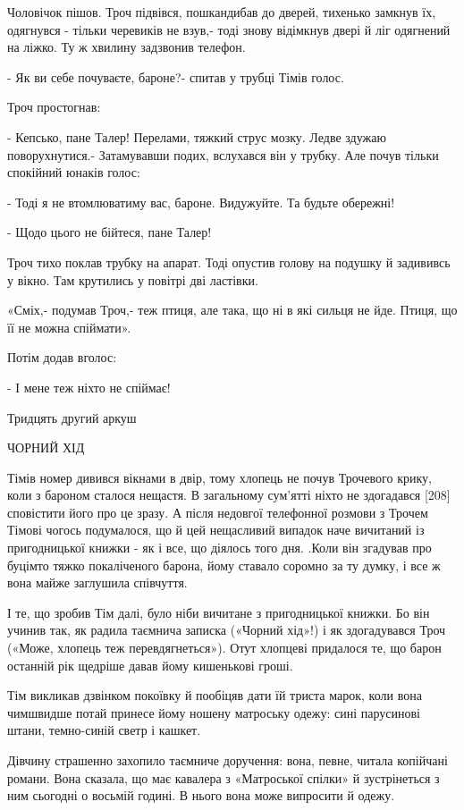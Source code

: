 Чоловічок пішов. Троч підвівся, пошкандибав до дверей, тихенько замкнув їх, одягнувся - тільки черевиків не взув,- тоді знову відімкнув двері й ліг одягнений на ліжко. Ту ж хвилину задзвонив телефон.

- Як ви себе почуваєте, бароне?- спитав у трубці Тімів голос.

Троч простогнав:

- Кепсько, пане Талер! Перелами, тяжкий струс мозку. Ледве здужаю поворухнутися.- Затамувавши подих, вслухався він у трубку. Але почув тільки спокійний юнаків голос:

- Тоді я не втомлюватиму вас, бароне. Видужуйте. Та будьте обережні!

- Щодо цього не бійтеся, пане Талер!

Троч тихо поклав трубку на апарат. Тоді опустив голову на подушку й задививсь у вікно. Там крутились у повітрі дві ластівки.

«Сміх,- подумав Троч,- теж птиця, але така, що ні в які сильця не йде. Птиця, що її не можна спіймати».

Потім додав вголос:

- І мене теж ніхто не спіймає!

Тридцять другий аркуш

ЧОРНИЙ ХІД

Тімів номер дивився вікнами в двір, тому хлопець не почув Трочевого крику, коли з бароном сталося нещастя. В загальному сум'ятті ніхто не здогадався [208] сповістити його про це зразу. А після недовгої телефонної розмови з Трочем Тімові чогось подумалося, що й цей нещасливий випадок наче вичитаний із пригодницької книжки - як і все, що діялось того дня. .Коли він згадував про буцімто тяжко покаліченого барона, йому ставало соромно за ту думку, і все ж вона майже заглушила співчуття.

І те, що зробив Тім далі, було ніби вичитане з пригодницької книжки. Бо він учинив так, як радила таємнича записка («Чорний хід»!) і як здогадувався Троч («Може, хлопець теж перевдягнеться»). Отут хлопцеві придалося те, що барон останній рік щедріше давав йому кишенькові гроші.

Тім викликав дзвінком покоївку й пообіцяв дати їй триста марок, коли вона чимшвидше потай принесе йому ношену матроську одежу: сині парусинові штани, темно-синій светр і кашкет.

Дівчину страшенно захопило таємниче доручення: вона, певне, читала копійчані романи. Вона сказала, що має кавалера з «Матроської спілки» й зустрінеться з ним сьогодні о восьмій годині. В нього вона може випросити й одежу.


